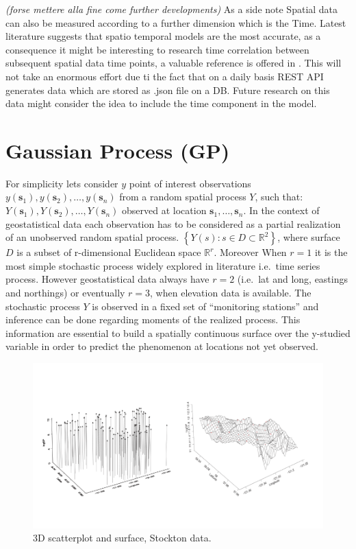 \documentclass[
  12pt,
  a4paper,
  oneside]{book}
\theoremstyle{definition}
\theoremstyle{definition}
\theoremstyle{definition}
\theoremstyle{remark}
\begin{document}
\emph{(forse mettere alla fine come further developments)}
As a side note Spatial data can also be measured according to a further dimension which is the Time. Latest literature suggests that spatio temporal models are the most accurate, as a consequence it might be interesting to research time correlation between subsequent spatial data time points, a valuable reference is offered in \citet{PACI2017149}. This will not take an enormous effort due ti the fact that on a daily basis REST API generates data which are stored as .json file on a DB. Future research on this data might consider the idea to include the time component in the model.

\hypertarget{GP}{%
\section{Gaussian Process (GP)}\label{GP}}

For simplicity lets consider \(y\) point of interest observations \(y\left(\boldsymbol{s}_{1}\right),y\left(\boldsymbol{s}_{2}\right), \ldots, y\left(\boldsymbol{s}_{n}\right)\)
from a random spatial process \(Y\), such that: \(Y\left(\boldsymbol{s}_{1}\right),Y\left(\boldsymbol{s}_{2}\right), \ldots, Y\left(\boldsymbol{s}_{n}\right)\) observed at location \(\boldsymbol{s}_{1}, \ldots, \boldsymbol{s}_{n}\). In the context of geostatistical data each observation has to be considered as a partial realization of an unobserved random spatial process.
\(\left\{Y(s): s \in D \subset \mathbb{R}^{2}\right\}\), where surface \(D\) is a subset of r-dimensional Euclidean space \(\mathbb{R}^{r}\).
Moreover When \(r = 1\) it is the most simple stochastic process widely explored in literature i.e.~time series process. However geostatistical data always have \(r = 2\) (i.e.~lat and long, eastings and northings) or eventually \(r = 3\), when elevation data is available. The stochastic process \(Y\) is observed in a fixed set of ``monitoring stations'' and inference can be done regarding moments of the realized process. This information are essential to build a spatially continuous surface over the y-studied variable in order to predict the phenomenon at locations not yet observed.

\begin{figure}
\centering
\includegraphics{images/prdprocess.png}
\caption{3D scatterplot and surface, Stockton data.}
\end{figure}
\end{document}
